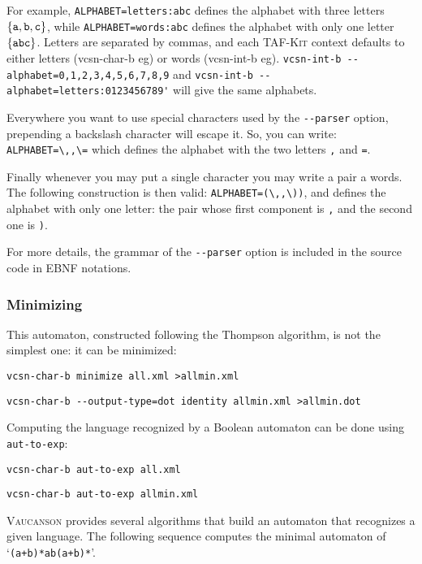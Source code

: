 \documentclass[a4paper]{report}
\newcommand{\Index}[1]{\index{#1}#1}
\newcommand\code[1]{\texttt{#1}}
\newcommand\samp[1]{`\texttt{#1}'}
\newcommand{\taffn}[1]{\code{#1}}
\newcommand{\tafkit}{\textsc{TAF-Kit}\xspace}
\newcommand{\Vauc}{\textsc{Vaucanson}\xspace}
\begin{document}
For example, \verb-ALPHABET=letters:abc- defines the alphabet with three letters
$\{\verb-a-, \verb-b-, \verb-c-\}$, while \verb-ALPHABET=words:abc- defines the
alphabet with only one letter $\{\verb-abc-\}$. Letters are separated by commas, and
each \tafkit context defaults to either letters (vcsn-char-b eg) or words
(vcsn-int-b eg). \verb|vcsn-int-b --alphabet=0,1,2,3,4,5,6,7,8,9| and
\verb|vcsn-int-b --alphabet=letters:0123456789'| will give the same alphabets.

Everywhere you want to use special characters used by the \verb|--parser|
option, prepending a backslash character will escape it. So, you can write:
\verb|ALPHABET=\,,\=| which defines the alphabet with the two letters \verb-,-
and \verb-=-.

Finally whenever you may put a single character you may write a pair a words.
The following construction is then valid: \verb|ALPHABET=(\,,\))|, and defines
the alphabet with only one letter: the pair whose first component is \verb-,-
and the second one is \verb-)-.

For more details, the grammar of the \verb|--parser| option is included in the
source code in EBNF notations.

\subsubsection{Minimizing}

This automaton, constructed following the Thompson algorithm, is not
the simplest one: it can be \index{minimize@\taffn{minimize}}minimized:

\begin{verbatim}
vcsn-char-b minimize all.xml >allmin.xml
\end{verbatim}
\begin{verbatim}
vcsn-char-b --output-type=dot identity allmin.xml >allmin.dot
\end{verbatim}

\bigskip

Computing the language recognized by a Boolean automaton can be done
using \Index{\taffn{aut-to-exp}}:

\begin{verbatim}
vcsn-char-b aut-to-exp all.xml
\end{verbatim}
\begin{verbatim}
vcsn-char-b aut-to-exp allmin.xml
\end{verbatim}

\Vauc provides several algorithms that build an automaton that
recognizes a given language.  The following sequence computes the
minimal automaton of \samp{(a+b)*ab(a+b)*}.
\end{document}
